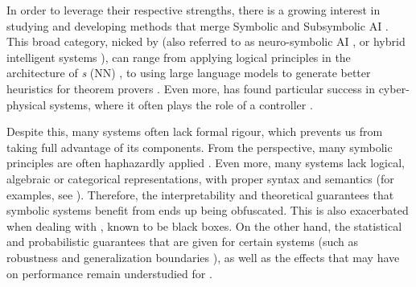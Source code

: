 In order to leverage their respective strengths, there is a growing interest in studying and developing methods that merge Symbolic and Subsymbolic AI \mcita{}. This broad category, nicked \emph{\InAI{}} by \citeauthor{Platzer_2024} (also referred to as neuro-symbolic AI \mcita{}, or hybrid intelligent systems \mcita{}), can range from applying logical principles in the architecture of \emph{ \NN{}s} (NN)  \mcita{}, to using large language models to generate better heuristics for theorem provers \mcita{}. Even more, \InAI{} has found particular success in cyber-physical systems, where it often plays the role of a controller \citep{Platzer_2024}. 

Despite this, many \InAI{} systems often lack formal rigour, which prevents us from taking full advantage of its components. From the \SiAI{} perspective,  many symbolic principles are often haphazardly applied \mcita{}. Even more, many \InAI{} systems lack logical, algebraic or categorical representations, with proper syntax and semantics (for examples, see \mcita{}). Therefore, the interpretability and theoretical guarantees that symbolic systems benefit from ends up being obfuscated. This is also exacerbated when dealing with \NN{}, known to be black boxes. On the other hand, the statistical and probabilistic guarantees that are given for certain \SuAI{}  systems (such as robustness \mcita{} and generalization boundaries \mcita{} ), as well as the effects that \SiAI{} may have on performance remain understudied for \InAI{}.


\yada


\TODO
